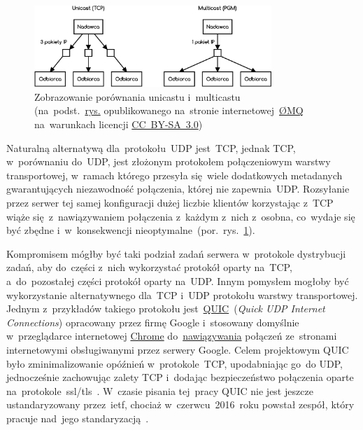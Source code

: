 \documentclass[thesis]{subfiles}
\begin{document}
\begin{figure}
	\centering
	\includegraphics[width=0.8\textwidth]{img/unicast-vs-multicast}
	\caption[Zobrazowanie porównania unicastu i~multicastu]{Zobrazowanie porównania unicastu i~multicastu\\(na~podst.~\href{http://zeromq.wdfiles.com/local--files/whitepapers\%3Adesign-v05/pgm2.png}{rys.} opublikowanego na~stronie internetowej~\href{http://zeromq.org/}{ØMQ} na~warunkach licencji  \href{https://creativecommons.org/licenses/by-sa/3.0/}{CC~BY-SA~3.0})}
	\label{fig:unicast-vs-multicast}
\end{figure}

Naturalną alternatywą dla~protokołu~UDP jest~TCP, jednak TCP, w~porównaniu do~UDP, jest złożonym protokołem połączeniowym warstwy transportowej, w~ramach którego przesyła się~wiele dodatkowych metadanych gwarantujących niezawodność połączenia, której nie zapewnia~UDP. Rozsyłanie przez serwer tej samej konfiguracji dużej liczbie klientów korzystając z~TCP wiąże się~z~nawiązywaniem połączenia z~każdym z~nich z~osobna, co~wydaje się być zbędne i~w~konsekwencji nieoptymalne~(por.~rys.~\ref{fig:unicast-vs-multicast}).

Kompromisem mógłby być taki podział zadań serwera w~protokole dystrybucji zadań, aby do~części z~nich wykorzystać protokół oparty na~TCP, a~do~pozostałej części protokół oparty na~UDP. Innym pomysłem mogłoby być wykorzystanie alternatywnego dla~TCP i~UDP protokołu warstwy transportowej. Jednym z~przykładów takiego protokołu jest~\href{https://en.wikipedia.org/wiki/QUIC}{QUIC}~(\emph{Quick UDP Internet Connections}) opracowany przez firmę Google i~stosowany domyślnie w~przeglądarce internetowej \href{https://www.google.pl/chrome/}{Chrome} do~\href{https://cs.chromium.org/chromium/src/net/tools/quic/quic_server.cc}{nawiązywania} połączeń ze~stronami internetowymi obsługiwanymi przez serwery Google. Celem projektowym QUIC było zminimalizowanie opóźnień w~protokole~TCP, upodabniając go~do UDP, jednocześnie zachowując zalety TCP i~dodając bezpieczeństwo połączenia oparte na~protokole~\gls{ssl/tls}~\cite{quic-wire-layout-spec,quic-crypto,quic-roskind}. W~czasie pisania tej~pracy QUIC nie jest jeszcze ustandaryzowany przez~\gls{ietf}, chociaż w~czerwcu~2016~roku powstał zespół, który pracuje nad~jego standaryzacją~\cite{quic-draft,quic-workinggroup}.
\end{document}
